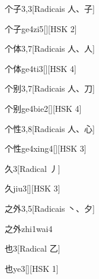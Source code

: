 \begin{entry}{个子}{3,3}[Radicais ⼈、⼦]
  \begin{phonetics}{个子}{ge4zi5}[][HSK 2]
  \end{phonetics}
\end{entry}

\begin{entry}{个体}{3,7}[Radicais ⼈、⼈]
  \begin{phonetics}{个体}{ge4ti3}[][HSK 4]
  \end{phonetics}
\end{entry}

\begin{entry}{个别}{3,7}[Radicais ⼈、⼑]
  \begin{phonetics}{个别}{ge4bie2}[][HSK 4]
  \end{phonetics}
\end{entry}

\begin{entry}{个性}{3,8}[Radicais ⼈、⼼]
  \begin{phonetics}{个性}{ge4xing4}[][HSK 3]
  \end{phonetics}
\end{entry}

\begin{entry}{久}{3}[Radical ⼃]
  \begin{phonetics}{久}{jiu3}[][HSK 3]
  \end{phonetics}
\end{entry}

\begin{entry}{之外}{3,5}[Radicais ⼂、⼣]
  \begin{phonetics}{之外}{zhi1wai4}
  \end{phonetics}
\end{entry}

\begin{entry}{也}{3}[Radical ⼄]
  \begin{phonetics}{也}{ye3}[][HSK 1]
  \end{phonetics}
\end{entry}

